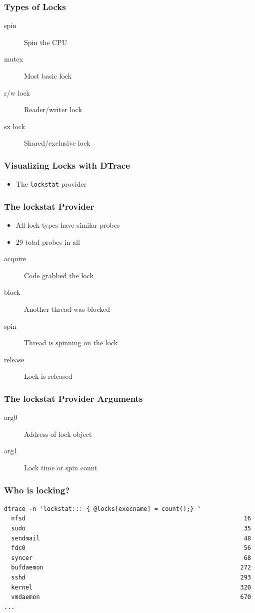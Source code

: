 \documentclass[pdftex]{beamer} %
\begin{document}
\begin{frame}
  \frametitle{Types of Locks}
  \begin{description}
  \item[spin] Spin the CPU
  \item[mutex] Most basic lock
  \item[r/w lock] Reader/writer lock
  \item[sx lock] Shared/exclusive lock
  \end{description}
\end{frame}

\begin{frame}[fragile]
  \frametitle{Visualizing Locks with DTrace}
  \begin{itemize}
  \item The \verb|lockstat| provider
  \end{itemize}
\end{frame}

\begin{frame}
  \frametitle{The lockstat Provider}
  \begin{itemize}
  \item All lock types have similar probes
  \item 29 total probes in all
  \end{itemize}
  \begin{description}
  \item[acquire] Code grabbed the lock
  \item[block] Another thread was blocked
  \item[spin] Thread is spinning on the lock
  \item[release] Lock is released
  \end{description}
\end{frame}

\begin{frame}
  \frametitle{The lockstat Provider Arguments}
  \begin{description}
  \item[arg0] Address of lock object
  \item[arg1] Lock time or spin count
  \end{description}
\end{frame}

\begin{frame}[fragile]
  \frametitle{Who is locking?}
\begin{verbatim}
dtrace -n 'lockstat::: { @locks[execname] = count();} '
  nfsd                                                             16
  sudo                                                             35
  sendmail                                                         48
  fdc0                                                             56
  syncer                                                           68
  bufdaemon                                                       272
  sshd                                                            293
  kernel                                                          320
  vmdaemon                                                        670
...
\end{verbatim}
\end{frame}
\end{document}
